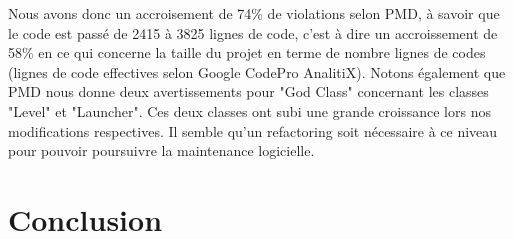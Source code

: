 \documentclass[a4paper,12pt]{report} %
\begin{document}
Nous avons donc un accroisement de 74\% de violations selon PMD, à savoir
que le code est passé de 2415 à 3825 lignes de code, c'est à dire
un accroissement de 58\% en ce qui concerne la taille du projet en terme de nombre
lignes de codes (lignes de code effectives selon Google CodePro AnalitiX).
Notons également que PMD nous donne deux avertissements pour "God Class"
concernant les classes "Level" et "Launcher". Ces deux classes ont subi une grande croissance lors nos
modifications respectives. Il semble qu'un refactoring soit nécessaire
à ce niveau pour pouvoir poursuivre la maintenance logicielle.

\section{Conclusion}
\end{document}
